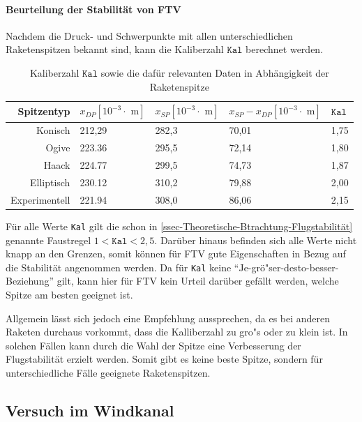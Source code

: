 \documentclass[10pt,a4paper]{article}
\begin{document}
\paragraph{Beurteilung der Stabilität von FTV}
Nachdem die Druck- und Schwerpunkte mit allen unterschiedlichen Raketenspitzen bekannt sind, kann die Kaliberzahl $\mathtt{Kal}$ berechnet werden.

\begin{table}[H]
	\caption{Kaliberzahl $\mathtt{Kal}$ sowie die dafür relevanten Daten in Abhängigkeit der Raketenspitze}
	\label{tab-Kaliberzahlen}
	\centering
	\begin{tabular}{r|lll|l}
		\toprule
		Spitzentyp	& $x_{DP} [10^{-3} \cdot \text{ m}]$ & $x_{SP} [10^{-3} \cdot \text{ m}]$ & $x_{SP} - x_{DP} [10^{-3} \cdot \text{ m}]$ & $\mathtt{Kal}$ \\
		\midrule
		Konisch			& 212,29  & 282,3  & 70,01 &  1,75 \\
		Ogive			& 223.36  & 295,5  & 72,14 &  1,80 \\
		Haack			& 224.77  & 299,5  & 74,73 &  1,87 \\
		Elliptisch		& 230.12  & 310,2  & 79,88 &  2,00 \\
		Experimentell	& 221.94  & 308,0  & 86,06 &  2,15 \\
		\bottomrule
	\end{tabular}
\end{table}

\noindent
Für alle Werte \texttt{Kal} gilt die schon in \ref{ssec-Theoretische-Btrachtung-Flugstabilität} genannte Faustregel $1 < \mathtt{Kal} < 2,5$. Darüber hinaus befinden sich alle Werte nicht knapp an den Grenzen, somit können für FTV gute Eigenschaften in Bezug auf die Stabilität angenommen werden. Da für \texttt{Kal} keine "`Je-grö"ser-desto-besser-Beziehung"' gilt, kann hier für FTV kein Urteil darüber gefällt werden, welche Spitze am besten geeignet ist.

Allgemein lässt sich jedoch eine Empfehlung aussprechen, da es bei anderen Raketen durchaus vorkommt, dass die Kalliberzahl zu gro"s oder zu klein ist. In solchen Fällen kann durch die Wahl der Spitze eine Verbesserung der Flugstabilität erzielt werden. Somit gibt es keine beste Spitze, sondern für unterschiedliche Fälle geeignete Raketenspitzen. 


\subsection{Versuch im Windkanal}
\end{document}
